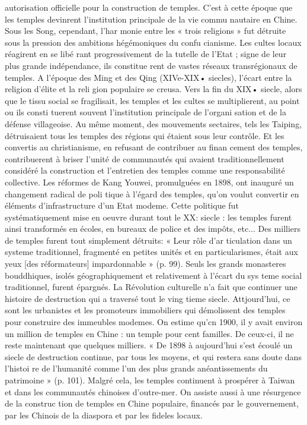 autorisation officielle pour la construction de temples. C'est à cette époque que les temples devinrent l'institution principale de la vie commu­ nautaire en Chine. Sous les Song, cependant, l'har­ monie entre les « trois religions » fut détruite sous la pression des ambitions hégémoniques du confu­ cianisme. Les cultes locaux réagirent en se libé­ rant progressivement de la tutelle de l'Etat ; signe de leur plus grande indépendance, ils constitue­ rent de vastes réseaux transrégionaux de temples. A l'époque des Ming et des Qing (XIVe-XIX• siecles), l'écart entre la religion d'élite et la reli­ gion populaire se creusa. Vers la fin du XIX• siecle, alors que le tissu social se fragilisait, les temples et les cultes se multiplierent, au point ou ils consti­ tuerent souvent l'institution principale de l'organi­ sation et de la défense villageoise. Au même moment, des mouvements sectaires, tels les Taiping, détruisaient tous les temples des régions qui étaient sous leur contrôle. Et les convertis au christianisme, en refusant de contribuer au finan­ cement des temples, contribuerent à briser l'unité de communautés qui avaient traditionnellement considéré la construction et l'entretien des temples comme une responsabilité collective.
Les réformes de Kang Youwei, promulguées en 1898, ont inauguré un changement radical de poli­ tique à l'égard des temples, qu'on voulut convertir en éléments d'infrastructure d'un Etat modeme. Cette politique fut systématiquement mise en oeuvre durant tout le XX: siecle : les temples furent ainsi transformés en écoles, en bureaux de police et des impôts, etc... Des milliers de temples furent tout simplement détruits: « Leur rôle d'ar­ ticulation dans un systeme traditionnel, fragmenté en petites unités et en particularismes, était aux yeux [des réformateurs] impardonnable » (p. 99). Seuls les grands monasteres bouddhiques, isolés géographiquement et relativement à l'écart du sys­ teme social traditionnel, furent épargnés. La Révolution culturelle n'a fait que continuer une histoire de destruction qui a traversé tout le ving­ tieme siecle. Attjourd'hui, ce sont les urbanistes et les promoteurs immobiliers qui démolissent des temples pour construire des immeubles modemes. On estime qu'cn 1900, il y avait environ un million de temples en Chine : un temple pour
cent familles. De ceux-ci, il ne reste maintenant que quelques milliers. « De 1898 à aujourd'hui s'est écoulé un siecle de destruction continue, par tous les moyens, et qui restera sans doute dans l'histoi­ re de l'humanité comme l'un des plus grands anéantissements du patrimoine » (p. 101). Malgré cela, les temples continuent à prospérer à Taiwan et dans les communautés chinoises d'outre-mer. On assiste aussi à une résurgence de la construc­ tion de temples en Chine populaire, financés par le gouvernement, par les Chinois de la diaspora et par les fideles locaux.
